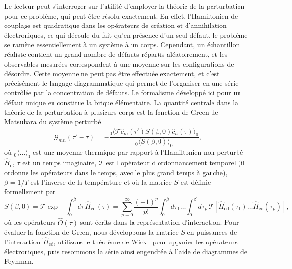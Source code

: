 Le lecteur peut s'interroger sur l'utilité d'employer la théorie de la perturbation pour ce problème, qui peut être résolu exactement. En effet, l'Hamiltonien de couplage est quadratique dans les opérateurs de création et d'annihilation électroniques, ce qui découle du fait qu'en présence d'un seul défaut, le problème se ramène essentiellement à un système à un corps. Cependant, un échantillon réaliste contient un grand nombre de défauts répartis aléatoirement, et les observables mesurées correspondent à une moyenne sur les configurations de désordre. Cette moyenne ne peut pas être effectuée exactement, et c'est précisément le langage diagrammatique qui permet de l'organiser en une série contrôlée par la concentration de défauts. Le formalisme développé ici pour un défaut unique en constitue la brique élémentaire. La quantité centrale dans la théorie de la perturbation à plusieurs corps est la fonction de Green de Matsubara du système perturbé
\begin{equation}
    \mathcal{G}_{mn}(\tau'-\tau) = -\frac{{}_{0}\langle\mathcal{T}\hat{c}_m(\tau')S
    (\beta, 0)\hat{c}^\dag_n(\tau)\rangle_0}{{}_{0}\langle S(\beta, 0) \rangle_0},\label{eqn:ad_G}
\end{equation}
où ${}_{0}\langle\dots\rangle_0$ est une moyenne thermique par rapport à l'Hamiltonien non perturbé $\hat{H}_\text{e}$, $\tau$ est un temps imaginaire, $\mathcal{T}$ est l'opérateur d'ordonnancement temporel (il ordonne les opérateurs dans le temps, avec le plus grand temps à gauche), $\beta=1/T$ est l'inverse de la température et où la matrice $S$ est définie formellement par
\begin{equation}
    S(\beta, 0) = \mathcal{T}\exp{-\int_0^\beta d\tau\, \hat{H}_\text{ed}(\tau)} = \sum_{p=0}^\infty \frac{(-1)^p}{p!}\int_0^\beta d\tau_1\dots\int_0^\beta d\tau_p\,\mathcal{T}\left[\hat{H}_\text{ed}(\tau_1)\dots\hat{H}_\text{ed}(\tau_p)\right],
\end{equation}
où les opérateurs $\hat{O}(\tau)$ sont écrits dans la représentation d'interaction. Pour évaluer la fonction de Green, nous développons la matrice $S$ en puissances de l'interaction $\hat{H}_\text{ed}$, utilisons le théorème de Wick~\cite{wickEvaluationCollisionMatrix1950} pour apparier les opérateurs électroniques, puis resommons la série ainsi engendrée à l'aide de diagrammes de Feynman.

